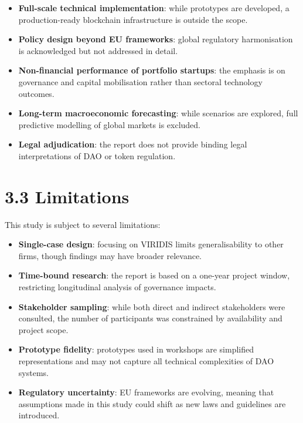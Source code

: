 \documentclass[
  english,
  12pt,
  oneside,
  open=any]{scrbook}
\providecommand{\tightlist}{%
  \setlength{\itemsep}{0pt}\setlength{\parskip}{0pt}}\usepackage{longtable,booktabs,array}
\begin{document}
\begin{itemize}
\tightlist
\item
  \textbf{Full-scale technical implementation}: while prototypes are
  developed, a production-ready blockchain infrastructure is outside the
  scope.\\
\item
  \textbf{Policy design beyond EU frameworks}: global regulatory
  harmonisation is acknowledged but not addressed in detail.\\
\item
  \textbf{Non-financial performance of portfolio startups}: the emphasis
  is on governance and capital mobilisation rather than sectoral
  technology outcomes.\\
\item
  \textbf{Long-term macroeconomic forecasting}: while scenarios are
  explored, full predictive modelling of global markets is excluded.\\
\item
  \textbf{Legal adjudication}: the report does not provide binding legal
  interpretations of DAO or token regulation.
\end{itemize}

\section{3.3 Limitations}\label{sec-limits}

This study is subject to several limitations:

\begin{itemize}
\tightlist
\item
  \textbf{Single-case design}: focusing on VIRIDIS limits
  generalisability to other firms, though findings may have broader
  relevance.\\
\item
  \textbf{Time-bound research}: the report is based on a one-year
  project window, restricting longitudinal analysis of governance
  impacts.\\
\item
  \textbf{Stakeholder sampling}: while both direct and indirect
  stakeholders were consulted, the number of participants was
  constrained by availability and project scope.\\
\item
  \textbf{Prototype fidelity}: prototypes used in workshops are
  simplified representations and may not capture all technical
  complexities of DAO systems.\\
\item
  \textbf{Regulatory uncertainty}: EU frameworks are evolving, meaning
  that assumptions made in this study could shift as new laws and
  guidelines are introduced.
\end{itemize}
\end{document}
